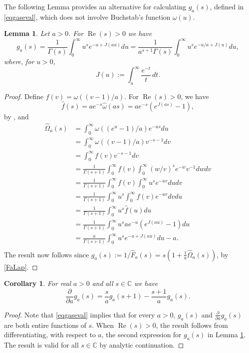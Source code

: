 \documentclass[11pt]{amsart}
\newtheorem{corollary}{Corollary}
\newtheorem{lemma}{Lemma}
\DeclareMathOperator{\re}{Re}
\begin{document}
The following Lemma provides an alternative for calculating $g_a(s)$, defined in \eqref{eqgaseval}, which does not involve Buchstab's function $\omega(u)$. 
\begin{lemma}\label{lemgJ}
Let $a>0$. 
For $\re(s)>0$ we have 
$$
g_a(s) = \frac{1}{\Gamma(s)} \int_0^\infty u^s e^{-u+J(au)} du = \frac{1}{a^{s+1} \Gamma(s)} \int_0^\infty u^s e^{-u/a+J(u)} du  ,
$$
where, for $u>0$,
$$
J(u):=\int_u^\infty \frac{e^{-t}}{t} \, dt.
$$
\end{lemma}

\begin{proof}
Define $f(v)=\omega((v-1)/a)$.  For  $\re(s)>0$, we have
$$\hat{f}(s) = a e^{-s} \hat{\omega}(as) =a e^{-s}(e^{J(as)}-1),$$ 
by \cite[Eq. III.6.36]{Ten},
and 
\begin{equation*}
\begin{split}
\widehat{\Omega}_a(s) &=
\int_0^\infty \omega((e^u-1)/a) e^{-us} du  \\
&= \int_0^\infty \omega((v-1)/a) v^{-s-1} dv  \\
&=\int_0^\infty f(v) v^{-s-1} dv  \\
&=\frac{1}{ \Gamma(s+1)}\int_0^\infty f(v)  \int_0^\infty (w/v)^s e^{-w} v^{-1} dw dv  \\
&=\frac{1}{ \Gamma(s+1)}\int_0^\infty f(v)  \int_0^\infty u^s e^{-uv} du dv  \\
&= \frac{1}{ \Gamma(s+1)} \int_0^\infty u^s \int_0^\infty f(v)   e^{-uv} dv du  \\
&= \frac{1}{ \Gamma(s+1)} \int_0^\infty u^s  \hat{f}(u) du  \\
&= \frac{1}{ \Gamma(s+1)} \int_0^\infty u^s  a e^{-u}(e^{J(au)}-1) du  \\
&= \frac{a}{ \Gamma(s+1)} \int_0^\infty u^s   e^{-u + J(au)}du -a.  \\
\end{split}
\end{equation*}
The result now follows since $g_a(s):=1/\widehat{F}_a(s)=s(1+\frac{1}{a}\widehat{\Omega}_a(s) )$, by \eqref{FaLap}. 
\end{proof}


\begin{corollary}\label{cordgda}
For real $a>0$ and all $s\in \mathbb{C}$ we have
$$
\frac{\partial }{ \partial a} g_a(s) = \frac{s}{a} g_a(s+1)-\frac{s+1}{a} g_a(s).
$$
\end{corollary}

\begin{proof}
Note that \eqref{eqgaseval} implies that for every $a>0$, $g_a(s)$ and $\frac{\partial}{\partial a} g_a(s) $ are both entire functions of $s$. 
When $\re(s)>0$, the result follows from differentiating, with respect to $a$, the second expression for $g_a(s)$ in Lemma \ref{lemgJ}.
The result is valid for all $s\in \mathbb{C}$ by analytic continuation.
\end{proof}
\end{document}

